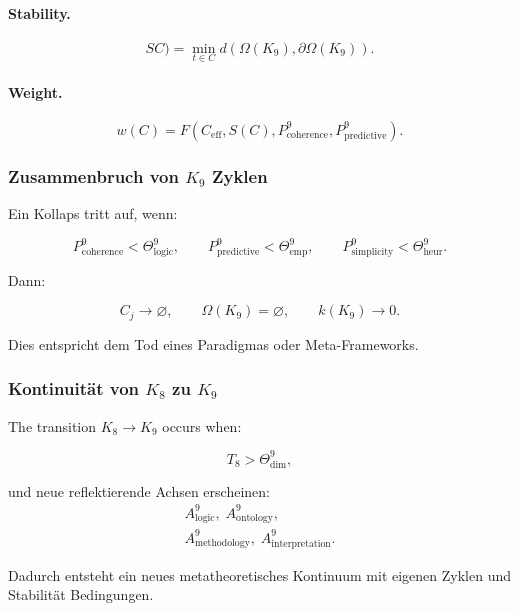 \paragraph{Stability.}
\[
SC)
    = \min_{t\in C}
      d(\Omega(K_9),\partial\Omega(K_9)).
\]

\paragraph{Weight.}
\[
  w(C) = F(C_{\mathrm{eff}}, S(C),
          P^9_{\mathrm{coherence}},
          P^9_{\mathrm{predictive}}).
\]


\subsubsection{Zusammenbruch von \texorpdfstring{$K_9$}{K_9} Zyklen}

Ein Kollaps tritt auf, wenn:

\[
  P^9_{\mathrm{coherence}} < \Theta^9_{\mathrm{logic}},\qquad
  P^9_{\mathrm{predictive}} < \Theta^9_{\mathrm{emp}},\qquad
  P^9_{\mathrm{simplicity}} < \Theta^9_{\mathrm{heur}}.
\]

Dann:

\[
  C_j \to \varnothing,\qquad
  \Omega(K_9)=\varnothing,\qquad
  k(K_9)\to 0.
\]

Dies entspricht dem Tod eines Paradigmas oder Meta-Frameworks.


\subsubsection{Kontinuität von \texorpdfstring{$K_8$}{K_8} zu \texorpdfstring{$K_9$}{K_9}}

The transition $K_8\to K_9$ occurs when:

\[
  T_8 > \Theta^9_{\mathrm{dim}},
\]

und neue reflektierende Achsen erscheinen:
\[
  \begin{aligned}
  A^9_{\mathrm{logic}},\;
  A^9_{\mathrm{ontology}},\\
  A^9_{\mathrm{methodology}},\;
  A^9_{\mathrm{interpretation}}.
  \end{aligned}
\]

Dadurch entsteht ein neues metatheoretisches Kontinuum mit eigenen Zyklen und Stabilität
Bedingungen.
